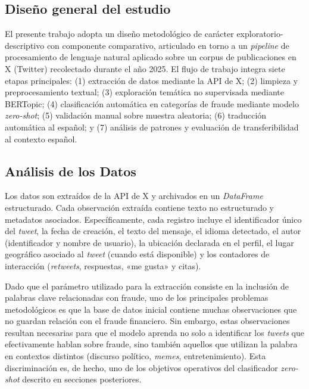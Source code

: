 \subsection{Diseño general del estudio}

El presente trabajo adopta un diseño metodológico de carácter exploratorio-descriptivo con componente comparativo, articulado en torno a un \textit{pipeline} de procesamiento de lenguaje natural aplicado sobre un corpus de publicaciones en X (Twitter) recolectado durante el año 2025. El flujo de trabajo integra siete etapas principales: (1) extracción de datos mediante la API de X; (2) limpieza y preprocesamiento textual; (3) exploración temática no supervisada mediante BERTopic; (4) clasificación automática en categorías de fraude mediante modelo \textit{zero-shot}; (5) validación manual sobre muestra aleatoria; (6) traducción automática al español; y (7) análisis de patrones y evaluación de transferibilidad al contexto español.

\subsection{Análisis de los Datos}

Los datos son extraídos de la API de X y archivados en un \textit{DataFrame} estructurado. Cada observación extraída contiene texto no estructurado y metadatos asociados. Específicamente, cada registro incluye el identificador único del \textit{tweet}, la fecha de creación, el texto del mensaje, el idioma detectado, el autor (identificador y nombre de usuario), la ubicación declarada en el perfil, el lugar geográfico asociado al \textit{tweet} (cuando está disponible) y los contadores de interacción (\textit{retweets}, respuestas, «me gusta» y citas).

Dado que el parámetro utilizado para la extracción consiste en la inclusión de palabras clave relacionadas con fraude, uno de los principales problemas metodológicos es que la base de datos inicial contiene muchas observaciones que no guardan relación con el fraude financiero. Sin embargo, estas observaciones resultan necesarias para que el modelo aprenda no solo a identificar los \textit{tweets} que efectivamente hablan sobre fraude, sino también aquellos que utilizan la palabra en contextos distintos (discurso político, \textit{memes}, entretenimiento). Esta discriminación es, de hecho, uno de los objetivos operativos del clasificador \textit{zero-shot} descrito en secciones posteriores.

